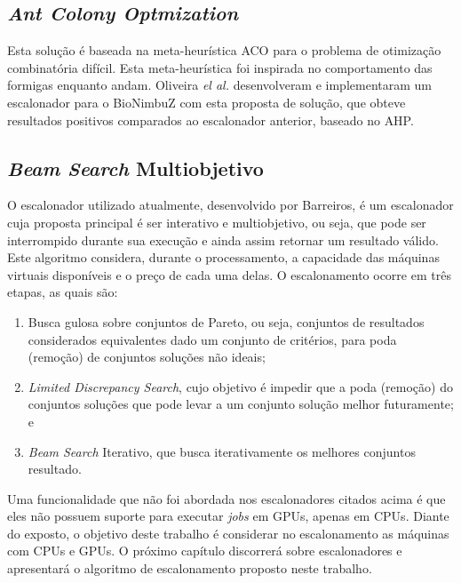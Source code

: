 \subsection{\textit{Ant Colony Optmization}}
Esta solução é baseada na meta-heurística \acrfull{ACO}\cite{ACO_DORIGO2005243} para o problema de otimização combinatória difícil. Esta meta-heurística foi inspirada no comportamento das formigas enquanto andam. Oliveira \textit{el al.}\cite{6732620_BioNimbuZ_ACOsched} desenvolveram e implementaram um escalonador para o BioNimbuZ com esta proposta de solução, que obteve resultados positivos comparados ao escalonador anterior, baseado no \acrshort{AHP}.

\subsection{\textit{Beam Search} Multiobjetivo}
O escalonador utilizado atualmente, desenvolvido por Barreiros\cite{BioNimbuZ_Willian_C99}, é um escalonador cuja proposta principal é ser interativo e multiobjetivo, ou seja, que pode ser interrompido durante sua execução e ainda assim retornar um resultado válido. Este algoritmo considera, durante o processamento, a capacidade das máquinas virtuais disponíveis e o preço de cada uma delas. O escalonamento ocorre em três etapas, as quais são:
\begin{enumerate}
	\item Busca gulosa sobre conjuntos de Pareto, ou seja, conjuntos de resultados considerados equivalentes dado um conjunto de critérios, para poda (remoção) de conjuntos soluções não ideais;
	\item \textit{Limited Discrepancy Search}\cite{Harvey:1995:LDS:1625855.1625935}, cujo objetivo é impedir que a poda (remoção) do conjuntos soluções que pode levar a um conjunto solução melhor futuramente; e
	\item \textit{Beam Search} Iterativo, que busca iterativamente os melhores conjuntos resultado.
\end{enumerate}

Uma funcionalidade que não foi abordada nos escalonadores citados acima é que eles não possuem suporte para executar \textit{jobs} em \acrshort{GPU}s, apenas em \acrshort{CPU}s. Diante do exposto, o objetivo deste trabalho é considerar no escalonamento as máquinas com \acrshort{CPU}s e \acrshort{GPU}s. O próximo capítulo discorrerá sobre escalonadores e apresentará o algoritmo de escalonamento proposto neste trabalho.